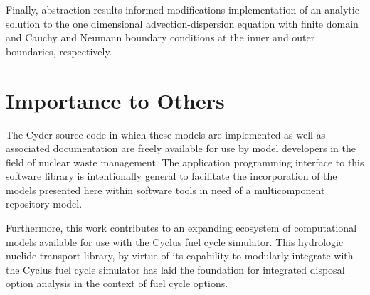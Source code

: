 \documentclass[letterpaper]{article}
\begin{document}
Finally, abstraction results informed modifications implementation of an 
analytic solution to the one dimensional advection-dispersion equation with 
finite domain and Cauchy and Neumann boundary conditions at the inner and outer 
boundaries, respectively. 

\section{Importance to Others}

The Cyder source code in which these models are implemented as well as 
associated documentation are freely available for use by model developers in the 
field of nuclear waste management. The application programming interface to this 
software library is intentionally general to facilitate the incorporation of the 
models presented here within software tools in need of a multicomponent repository 
model.

Furthermore, this work contributes to an expanding ecosystem of computational 
models available for use with the Cyclus fuel cycle simulator. This hydrologic 
nuclide transport library, by virtue of its capability to modularly integrate 
with the Cyclus fuel cycle simulator has laid the foundation for integrated 
disposal option analysis in the context of fuel cycle options. 
\end{document}

